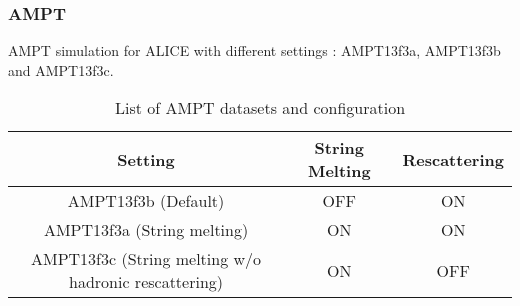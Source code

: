 \subsubsection{AMPT}

AMPT simulation for ALICE with different settings :  AMPT13f3a, AMPT13f3b and AMPT13f3c. \\ 

\begin{table}[!h]
\begin{center}
\begin{tabular}{c|c|c}
\hline 
Setting		    & String Melting    & Rescattering  \\  \hline  \hline
AMPT13f3b (Default)  & OFF     & ON        \\ \hline
AMPT13f3a (String melting)  & ON      &  ON        \\ \hline 
AMPT13f3c (String melting w/o hadronic rescattering)  & ON      & OFF         \\ \hline
\end{tabular}
\caption{List of AMPT datasets and configuration}
\label{AMPT_appendix}
\end{center}
\end{table}

